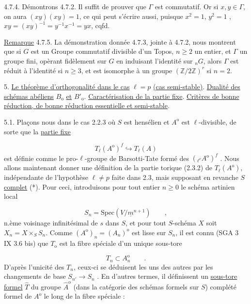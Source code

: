 4.7.4. Démontrons 4.7.2. Il suffit de prouver que $\Gamma$ est commutatif. Or si $x, y \in \Gamma$, on aura $(xy)(xy) = 1$, ce qui peut s'écrire aussi, puisque $x^2 = 1$, $y^2 = 1$ , $xy = (xy)^{-1} = y^{-1}x^{-1} = yx$, cqfd.

\underline{Remarque} 4.7.5. La démonstration donnée 4.7.3, jointe à 4.7.2, nous montrent que si $G$ est un Groupe commutatif divisible d'un Topos, $n \geq 2$ un entier, et $\Gamma$ un groupe fini, opèrant fidèlement sur $G$ en induisant l'identité sur ${}_nG$, alors $\Gamma$ est réduit à l'identité si $n \geq 3$, et est isomorphe à un groupe $(\mathbb{Z}/2\mathbb{Z})^r$ si $n=2$.




5. \underline{Le théorème d'orthogonalité dans le cas} $\ell = p$ \underline{(cas semi-stable)}. \underline{Dualité des schémas abéliens} $B_{\mathrm{o}}$ \underline{et} $B'_{\mathrm{o}}$. \underline{Caractérisation de la partie fixe}. \underline{Critères de bonne réduction, de bonne réduction essentielle et semi-stable}.

5.1. Plaçons nous dans le cas 2.2.3 où $S$ est hensélien et $A^{\mathrm{o}}$ est $\ell$-divisible, de sorte que la \underline{partie fixe}

\begin{equation*}
T_\ell(A^{\mathrm{o}})^f \hookrightarrow T_\ell(A)
\end{equation*}
est définie comme le pro-$\ell$-groupe de Barsotti-Tate formé des $({}_{\ell^\nu}A^{\mathrm{o}})^f$ . Nous allons maintenant donner une définition de la partie torique (2.3.2) de $T_\ell(A^{\mathrm{o}})$, indépendante de l'hypothèse $\ell \neq p$ faite dans 2.3, mais supposant en revanche $S$ \underline{complet} (*). Pour ceci, introduisons pour tout entier $n \geq 0$ le schéma artinien local

\begin{equation}\tag{5.1.1}
S_n = \mathrm{Spec}(V/\underline{m}^{n+1}) \qquad ,
\end{equation}
n.ème voisinage infinitésimal de $s$ dans $S$, et pour tout $S$-schéma $X$ soit $X_n = X\times_S S_n$. Comme $(A^{\mathrm{o}})_n = (A_n)^{\mathrm{o}}$ est lisse sur $S_n$, il est connu (SGA 3 IX 3.6 bis) que $T_{\mathrm{o}}$ est la fibre spéciale d'un unique sous-tore

\begin{equation}\tag{5.1.2}
T_n \subset A_n^{\mathrm{o}} \qquad .
\end{equation}
D'après l'unicité des $T_n$, ceux-ci se déduisent les uns des autres par les changements de base $S_{n'} \longrightarrow S_n$ . En d'autres termes, il définissent un \underline{sous-tore formel} $\hat{T}$ du groupe $\hat{A}^{\mathrm{o}}$ (dans la catégorie des schémas formels sur $S$) complété formel de $A^{\mathrm{o}}$ le long de la fibre spéciale :

